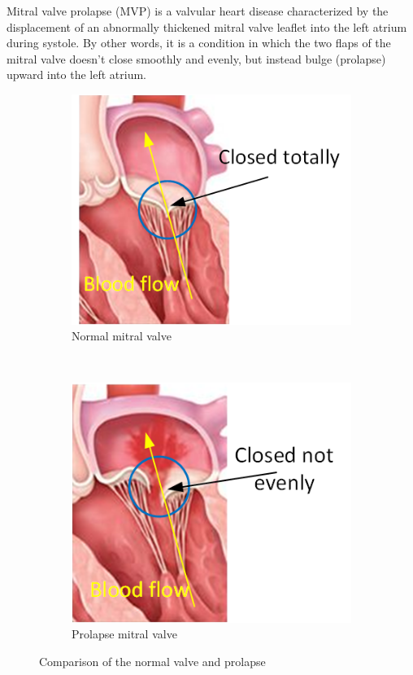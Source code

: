 Mitral valve prolapse (MVP) is a valvular heart disease characterized by the
displacement of an abnormally thickened mitral valve leaflet into the left
atrium during systole. By other words, it is a condition in which the two flaps
of the mitral valve doesn't close smoothly and evenly, but instead bulge
(prolapse) upward into the left atrium.\cite{Hayek2005a}
\begin{figure}[H]\label{fig:compareMT}
  \centering
  \begin{subfigure}[b]{0.4\textwidth}\label{fig:normalMT}
    \includegraphics[width=\textwidth]{./fig/normalMT.png}
      \caption{Normal mitral valve}      
  \end{subfigure}
  ~
  ~ 
  \begin{subfigure}[b]{0.4\textwidth}\label{fig:prolapseMT}
    \includegraphics[width=\textwidth]{./fig/prolapseMT.png}
      \caption{Prolapse mitral valve}      
  \end{subfigure}
  \caption{Comparison of the normal valve and prolapse}      
\end{figure} 
